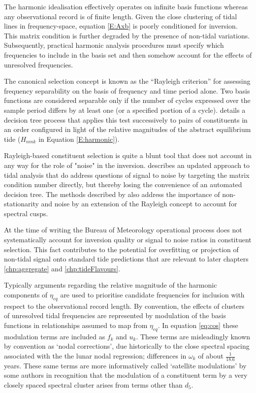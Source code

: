 The harmonic idealisation effectively operates on infinite basis functions whereas any observational record is of finite length.
Given the close clustering of tidal lines in frequency-space, equation \ref{E:Axb} is poorly conditioned for inversion.   This matrix condition is further degraded by the presence of non-tidal variations. 
Subsequently, practical harmonic analysis procedures must specify which frequencies to include in the basis set and then somehow account for the effects of unresolved frequencies.

The canonical selection concept is known as the ``Rayleigh criterion'' for assessing frequency separability on the basis of frequency and time period alone.  Two basis functions are considered separable only if the number of cycles expressed over the sample period differs by at least one (or a specified portion of a cycle). \citet[section 2.1.2]{Foreman:1977us} details a decision tree process that applies this test successively to pairs of constituents in an order configured in light of the relative magnitudes of the abstract equilibrium tide ($H_{nmk}$ in Equation \ref{E:harmonic}).

Rayleigh-based constituent selection is quite a blunt tool that does not account in any way for the role of "noise" in the inversion. \citet{Foreman:2009bg} describes an updated approach to tidal analysis that do address questions of signal to noise by targeting the matrix condition number directly, but thereby losing the convenience of an automated decision tree.  The methods described by \citet{Matte:2012df} also address the importance of non-stationarity and noise by an extension of the Rayleigh concept to account for spectral cusps.

At the time of writing the Bureau of Meteorology operational process does not systematically account for inversion quality or signal to noise ratios in constituent selection. 
This fact contributes to the potential for overfitting or projection of non-tidal signal onto standard tide predictions that are relevant to later chapters \ref{chp:aggregate} and \ref{chp:tideFlavours}.


Typically arguments regarding the relative magnitude of the harmonic components of $\eta_{eq}$ are used to prioritise candidate frequencies for inclusion with respect to the observational  record length. 
By convention, the effects of clusters of unresolved tidal frequencies are represented by modulation of the basis functions in relationships assumed to map from $\eta_{eq}$.  
In equation \ref{eq:cos} these modulation terms are included as $f_k$ and $u_k$.  These terms are misleadingly known by convention as `nodal corrections', due historically to the close spectral spacing associated with the the lunar nodal regression; differences in $\omega_k$ of about $\frac{1}{18.6}$ years.     These same terms are more informatively called `satellite modulations' by some authors in recognition that the modulation of a constituent term by a very closely spaced spectral cluster arises from terms other than $d_5$. 

